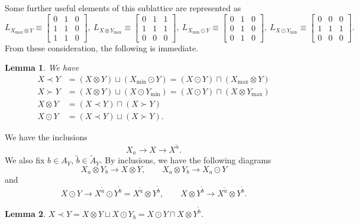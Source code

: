\documentclass[12pt]{article}
\newtheorem{lemma}{Lemma}
\theoremstyle{definition}
\theoremstyle{remark}
\begin{document}
Some further useful elements of this sublattice are represented as
\[
L_{X_{\max}\otimes Y}\equiv\begin{bmatrix}0 & 1 & 0\\ 1 & 1& 0\\ 1& 1&0  \end{bmatrix},\ 
L_{X\otimes Y_{\max}}\equiv\begin{bmatrix}0 & 1 & 1\\ 1 & 1& 1\\ 0& 0&0  \end{bmatrix},\ 
L_{X_{\min}\odot Y}\equiv\begin{bmatrix}0 & 1 & 0\\ 0 & 1& 0\\ 0& 1&0  \end{bmatrix},\ 
L_{X\odot Y_{\min }}\equiv\begin{bmatrix}0 & 0 & 0\\ 1 & 1& 1\\ 0& 0&0  \end{bmatrix}. 
\]
From these consideration, the following is immediate.

\begin{lemma}\label{lemma:lattice} We have
\begin{align*}
X\prec Y &= (X\otimes Y) \sqcup (X_{\min}\odot Y)=(X\odot Y)\sqcap (X_{\max}\otimes Y)\\
X\succ Y &= (X\otimes Y) \sqcup (X\odot Y_{\min})=(X\odot Y)\sqcap (X\otimes Y_{\max})\\
X\otimes Y & = (X\prec Y)\sqcap (X\succ Y)\\
X\odot Y & = (X\prec Y)\sqcup (X\succ Y).
\end{align*}


\end{lemma}









We have 
the inclusions 
\[
X_a\to X\to X^{\tilde a}.
\]
We also fix $b\in A_Y$, $\tilde b\in \tilde A_Y$. By inclusions, we have the following diagrams
\[
X_a\otimes Y_b\to X\otimes Y,\qquad X_a\otimes Y_b\to  X_a\odot Y
\]
and
\[
X\odot Y\to X^{\tilde a}\odot Y^{\tilde b}=X^{\tilde
a}\otimes Y^{\tilde b},\qquad X\otimes Y^{\tilde b}\to X^{\tilde a}\otimes Y^{\tilde b}.
\]


\begin{lemma}\label{lemma:minmax}
$X\prec Y=X\otimes Y\sqcup X\odot Y_b=X\odot Y \sqcap X\otimes Y^{\tilde b}$.
\end{lemma}
\end{document}
